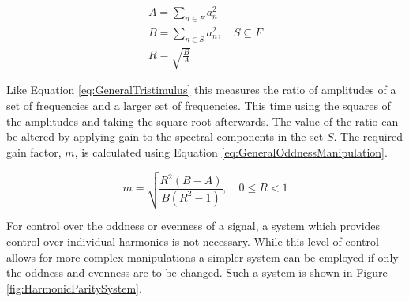 		\begin{gather}
			A = \sum_{n \in F} a_{n}^{2} \nonumber \\
			B = \sum_{n \in S} a_{n}^{2}, \quad S \subseteq F \nonumber \\
			R = \sqrt{\frac{B}{A}}
			\label{eq:GeneralOddness}
		\end{gather}

		Like Equation \ref{eq:GeneralTristimulus} this measures the ratio of amplitudes of a set of frequencies and
		a larger set of frequencies. This time using the squares of the amplitudes and taking the square root
		afterwards. The value of the ratio can be altered by applying gain to the spectral components in the set
		$S$. The required gain factor, $m$, is calculated using Equation \ref{eq:GeneralOddnessManipulation}.

		\begin{equation}
			m = \sqrt{\frac{R^{2}(B - A)}{B(R^{2} - 1)}}, \quad 0 \leq R < 1
			\label{eq:GeneralOddnessManipulation}
		\end{equation}

		For control over the oddness or evenness of a signal, a system which provides control over individual
		harmonics is not necessary. While this level of control allows for more complex manipulations a simpler
		system can be employed if only the oddness and evenness are to be changed.  Such a system is shown in
		Figure \ref{fig:HarmonicParitySystem}.

